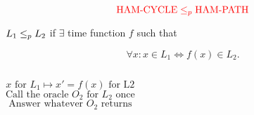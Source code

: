 \begin{frame}
  \[
	\textcolor{red}{\text{HAM-CYCLE} \le_{p} \text{HAM-PATH}}
  \]



\end{frame}

\begin{frame}
  \begin{definition}
	\begin{center}
	  $L_1 \le_{p} L_2$ if $\exists$  time function $f$ such that
	\end{center}
	\[
	  \forall x: x \in L_1 \iff f(x) \in L_2.
	\]
  \end{definition}

  \begin{columns}
	  \begin{center}
		\pause
		\[
		  x \text{ for } L_1 \mapsto x' = f(x) \text{ for L2}
		\]
		\pause
		\[
		  \text{Call the oracle } O_2 \text{ for } L_2 \text{ once}
		\]
		\pause
		\[
		  \text{Answer whatever } O_2 \text{ returns}
		\]
	  \end{center}
	  \pause
  \end{columns}
\end{frame}


